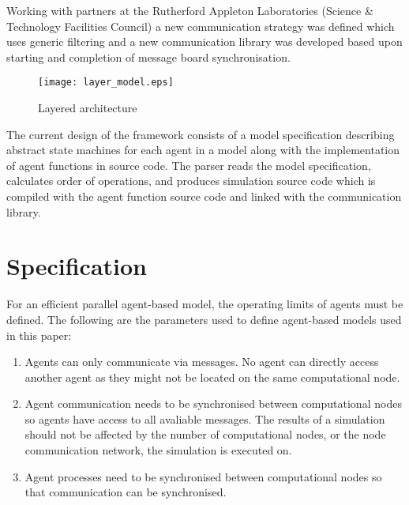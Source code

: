 \documentclass{aamas2009}
\begin{document}
Working with partners at the Rutherford Appleton Laboratories (Science \&
Technology Facilities Council) a new communication strategy was defined which
uses generic filtering and a new communication library was developed based upon
starting and completion of message board synchronisation.

\begin{figure}[hbp]
\centering
\texttt{[image: layer\_model.eps]}
\caption{Layered architecture}
\end{figure}

The current design of the framework consists of a model specification
describing abstract state machines for each agent in a model along with
the implementation of agent functions in source code. The parser reads the
model specification, calculates order of operations, and produces simulation
source code which is compiled with the agent function source code and linked
with the communication library.

\section{Specification}

For an efficient parallel agent-based model, the operating limits of agents
must be defined.
The following are the parameters used to define agent-based models used in this
paper:


\begin{enumerate}
  \item Agents can only communicate via messages. No agent can directly access
  another agent as they might not be located on the same computational node.
  \item Agent communication needs to be synchronised between computational nodes
  so agents have access to all avaliable messages. The results of a simulation
  should not be affected by the number of
computational nodes, or the node communication network, the simulation is
executed on.
  \item Agent processes need to be synchronised between computational nodes so
  that communication can be synchronised.
\end{enumerate}

\end{document}
